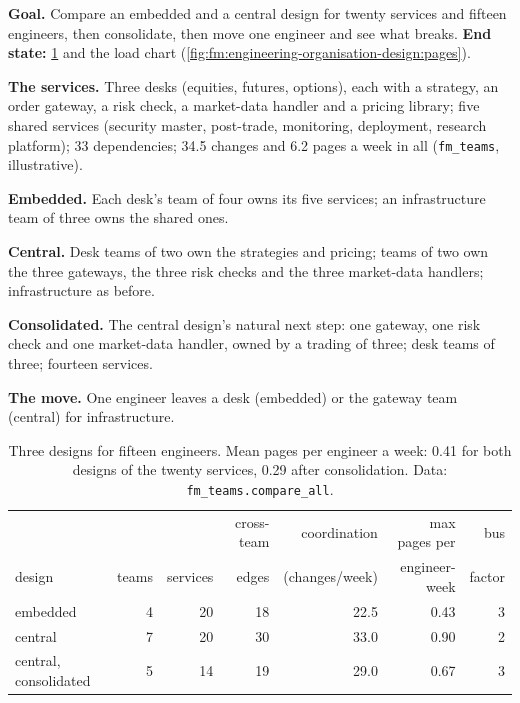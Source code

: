 \begin{tutorial}
\textbf{Goal.} Compare an embedded and a central design for twenty services and fifteen engineers, then consolidate, then move one engineer and
see what breaks. \textbf{End state:} \cref{tab:fm:engineering-organisation-design:designs} and the load chart
(\cref{fig:fm:engineering-organisation-design:pages}).
\begin{tutsteps}
\item \textbf{The services.} Three desks (equities, futures, options), each with a strategy, an order gateway, a risk check, a market-data handler and
a pricing library; five shared services (security master, post-trade, monitoring, deployment, research platform); 33 dependencies; 34.5 changes and
6.2 pages a week in all (\texttt{fm\_teams}, illustrative).
\item \textbf{Embedded.} Each desk's team of four owns its five services; an infrastructure team of three owns the shared ones.
\item \textbf{Central.} Desk teams of two own the strategies and pricing; teams of two own the three gateways, the three risk checks and the three
market-data handlers; infrastructure as before.
\item \textbf{Consolidated.} The central design's natural next step: one gateway, one risk check and one market-data handler, owned by a trading
 of three; desk teams of three; fourteen services.
\item \textbf{The move.} One engineer leaves a desk (embedded) or the gateway team (central) for infrastructure.
\end{tutsteps}
\end{tutorial}

\begin{table}[ht]
\centering\small
\begin{tabular}{lrrrrrr}
\toprule
 & & & cross-team & coordination & max pages per & bus \\
design & teams & services & edges & (changes/week) & engineer-week & factor \\
\midrule
embedded & 4 & 20 & 18 & 22.5 & 0.43 & 3 \\
central & 7 & 20 & 30 & 33.0 & 0.90 & 2 \\
central, consolidated & 5 & 14 & 19 & 29.0 & 0.67 & 3 \\
\bottomrule
\end{tabular}
\caption{Three designs for fifteen engineers. Mean pages per engineer a week: 0.41 for both designs of the twenty services, 0.29 after
consolidation. Data: \texttt{fm\_teams.compare\_all}.}\label{tab:fm:engineering-organisation-design:designs}
\end{table}

